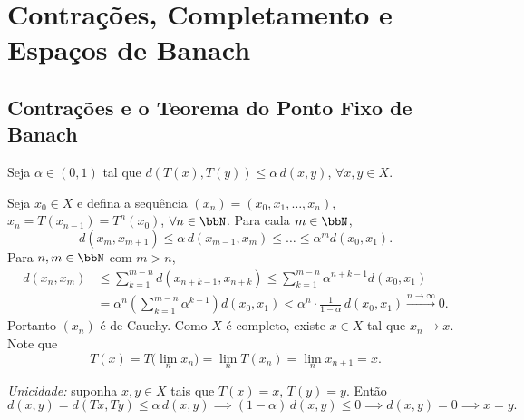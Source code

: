 \chapter{Contrações, Completamento e Espaços de Banach}

\section{Contrações e o Teorema do Ponto Fixo de Banach}



\begin{myproof}
	Seja $\alpha\in(0,1)$ tal que $d(T(x),T(y))\leq\alpha\, d(x,y)$, $\forall x,y\in X$.

	Seja $x_0\in X$ e defina a sequência $(x_n)=(x_0,x_1,\dots,x_n)$, $x_n=T(x_{n-1})=T^n(x_0)$,
	$\forall n\in\bbN$. Para cada $m\in\bbN$,
	$$d(x_m,x_{m+1})\leq \alpha\, d(x_{m-1},x_m)\leq\dots\leq \alpha^m d(x_0,x_1)\text{.}$$
	Para $n,m\in\bbN$ com $m>n$,
	\begin{align*}
		d(x_n,x_m) & \leq \sum_{k=1}^{m-n}d(x_{n+k-1},x_{n+k}) \leq \sum_{k=1}^{m-n}\alpha^{n+k-1}d(x_0,x_1) \\
		           & = \alpha^n\left(\sum_{k=1}^{m-n}\alpha^{k-1}\right)d(x_0,x_1) < \alpha^n\cdot\frac{1}{1-\alpha}\,d(x_0,x_1)\xrightarrow{n\to\infty}0\text{.}
	\end{align*}
	Portanto $(x_n)$ é de Cauchy. Como $X$ é completo, existe $x\in X$ tal que $x_n\to x$. Note que
	$$T(x)=T\Big(\lim_n x_n\Big)=\lim_n T(x_n)=\lim_n x_{n+1}=x\text{.}$$

	\textit{Unicidade:} suponha $x,y\in X$ tais que $T(x)=x$, $T(y)=y$. Então
	$$d(x,y)=d(Tx,Ty)\leq\alpha\, d(x,y) \implies (1-\alpha)\,d(x,y)\leq 0 \implies d(x,y)=0 \implies x=y\text{.}$$
\end{myproof}


